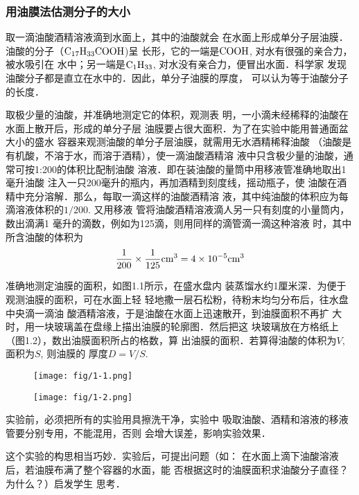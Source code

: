 \subsubsection{用油膜法估测分子的大小}

取一滴油酸酒精溶液滴到水面上，其中的油酸就会
在水面上形成单分子层油膜．油酸的分子（$\rm C_{17}H_{33}COOH$)呈
长形，它的一端是$\rm COOH$, 对水有很强的亲合力，被水吸引在
水中；另一端是$\rm C_1H_{33}$, 对水没有亲合力，便冒出水面．科学家
发现油酸分子都是直立在水中的．因此，单分子油膜的厚度，
可以认为等于油酸分子的长度．

取极少量的油酸，并准确地测定它的体积，观测表
明，一小滴未经稀释的油酸在水面上散开后，形成的单分子层
油膜要占很大面积．为了在实验中能用普通面盆大小的盛水
容器来观测油酸的单分子层油膜，就需用无水酒精稀释油酸
（油酸是有机酸，不溶于水，而溶于酒精），使一滴油酸酒精溶
液中只含极少量的油酸，通常可按1:200的体积比配制油酸
溶液．即在装油酸的量筒中用移液管准确地取出1毫升油酸
注入一只200毫升的瓶内，再加酒精到刻度线，摇动瓶子，使
油酸在酒精中充分溶解．那么，每取一滴这样的油酸酒精溶
液，其中纯油酸的体积应为每滴溶液体积的$1/200$. 又用移液
管将油酸酒精溶液滴人另一只有刻度的小量筒内，数出滴满1
毫升的滴数，例如为125滴，则用同样的滴管滴一滴这种溶液
时，其中所含油酸的体积为
\[\frac{1}{200}\times\frac{1}{125}{\rm cm}^3=4\times 10^{-5}{\rm cm}^3\]

准确地测定油膜的面积，如图1.1所示，在盛水盘内
装蒸馏水约1厘米深．为便于观测油膜的面积，可在水面上轻
轻地撒一层石松粉，待粉末均匀分布后，往水盘中央滴一滴油
酸酒精溶液，于是油酸在水面上迅速散开，到油膜面积不再扩
大时，用一块玻璃盖在盘缘上描出油膜的轮廓图．然后把这
块玻璃放在方格纸上（图1.2），数出油膜面积所占的格数，算
出油膜的面积．若算得油酸的体积为$V$, 面积为$S$, 则油膜的
厚度$D=V/S$.
\begin{figure}[htp]\centering
    \begin{minipage}[t]{0.48\textwidth}
    \centering
\texttt{[image: fig/1-1.png]}
    \caption{}
    \end{minipage}
    \begin{minipage}[t]{0.48\textwidth}
    \centering
    \texttt{[image: fig/1-2.png]}
    \caption{}
    \end{minipage}
    \end{figure}

实验前，必须把所有的实验用具擦洗干净，实验中
吸取油酸、酒精和溶液的移液管要分别专用，不能混用，否则
会增大误差，影响实验效果．

这个实验的构思相当巧妙．实验后，可提出问题（如：
在水面上滴下油酸溶液后，若油膜布满了整个容器的水面，能
否根据这时的油膜面积求油酸分子直径？为什么？）启发学生
思考．

